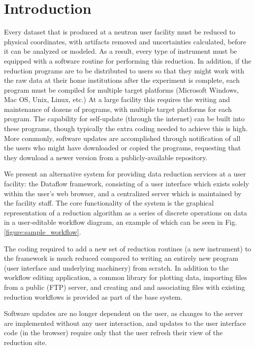 \documentclass[pdf]{iucr}           %
\begin{document}
\section{Introduction}

Every dataset that is produced at a neutron user facility must be reduced to physical coordinates,
with artifacts removed and uncertainties calculated, before it can be analyzed or modeled.
As a result, every type of instrument must be equipped with a software routine for performing this 
reduction.  In addition, if the reduction programs are to be distributed to users so that
they might work with the raw data at their home institutions after the experiment is complete,
each program must be compiled for multiple target platforms 
(Microsoft Windows, Mac OS, Unix, Linux, etc.) 
At a large facility this requires the writing and maintenance of dozens of programs, with multiple
target platforms for each program.
The capability for self-update (through the internet) can be built into these programs, though typically
the extra coding needed to achieve this is high.  More commonly, software updates are accomplished through
notification of all the users who might have downloaded or copied the programs, requesting that they 
download a newer version from a publicly-available repository.

We present an alternative system for providing data reduction services at a user facility: 
the Dataflow framework, consisting of
a user interface which exists solely within the user's web browser, and a centralized server which
is maintained by the facility staff.  The core functionality of the system is the graphical representation
of a reduction algorithm as a series of discrete operations on data in a user-editable workflow diagram,
an example of which can be seen in Fig. \ref{figure:sample_workflow}.

The coding required to add a new set of reduction routines
(a new instrument) to the framework is much reduced compared to writing an entirely new program
(user interface and underlying machinery) from scratch.  In addition to the workflow editing application, 
a common library for plotting data, importing files from a public (FTP) server, 
and creating and and associating files with existing reduction workflows is provided as part
of the base system.

Software updates are no longer dependent on the user, as
changes to the server are implemented without any user interaction,
and updates to the user interface code (in the browser) require only that 
the user refresh their view of the reduction site. 
\end{document}
